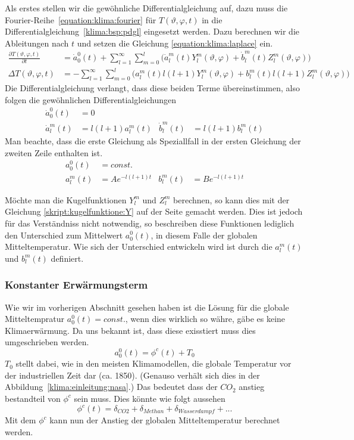\begin{refsection}
Als erstes stellen wir die gewöhnliche Differentialgleichung auf, dazu muss die Fourier-Reihe~\eqref{equation:klima:fourier} für $T(\vartheta ,\varphi ,t)$ in die Differentialgleichung~\eqref{klima:bsp:pdgl} eingesetzt werden.
Dazu berechnen wir die Ableitungen nach $t$ und setzen die Gleichung \eqref{equation:klima:laplace} ein.
\begin{align*}
\frac{\partial T(\vartheta ,\varphi ,t)}{\partial t} &=
\dot{a}^0_0(t)+\sum_{l=1}^\infty\sum_{m=0}^l \bigl( \dot{a}^m_l(t)Y^m_l(\vartheta ,\varphi)+\dot{b}^m_l(t)Z^m_l(\vartheta ,\varphi)\bigr)
\\
\Delta T(\vartheta ,\varphi ,t) &=
- \sum_{l=1}^\infty\sum_{m=0}^l \bigl( a^m_l(t)l(l+1)Y^m_l(\vartheta ,\varphi)+b^m_l(t)l(l+1)Z^m_l(\vartheta ,\varphi)\bigr)
\end{align*}
Die Differentialgleichung verlangt, dass diese beiden Terme übereinstimmen, also folgen die gewöhnlichen Differentialgleichungen
\begin{align*}
\dot a^0_0(t)&= 0
\\
\dot a^m_l(t)&=l(l+1)a^m_l(t)&
\dot b^m_l(t)&=l(l+1)b^m_l(t)
\end{align*}
Man beachte, dass die erste Gleichung als Speziallfall in der ersten
Gleichung der zweiten Zeile enthalten ist.
\begin{align*}
a^0_0(t)&=const.
\\
a^m_l(t) &=Ae^{-l(l+1)t}&
b^m_l(t) &=Be^{-l(l+1)t}
\end{align*}

Möchte man die Kugelfunktionen $Y^m_l$ und $Z^m_l$ berechnen, so kann dies mit der Gleichung \eqref{skript:kugelfunktione:Y} auf der Seite \pageref{skript:kugelfunktione:Y} gemacht werden. Dies ist jedoch für das Verständniss nicht notwendig, so beschreiben diese Funktionen lediglich den Unterschied zum Mittelwert $a^0_0(t)$, in diesem Falle der globalen Mitteltemperatur. Wie sich der Unterschied entwickeln wird ist durch die $a^m_l(t)$ und $b^m_l(t)$ definiert.


\subsubsection{Konstanter Erwärmungsterm
\label{subsubsection:klima:erwaermungsterm}}
Wie wir im vorherigen Abschnitt gesehen haben ist die Lösung für die globale Mitteltempratur $a^0_0(t)=const.$, wenn dies wirklich so währe, gäbe es keine Klimaerwärmung. Da uns bekannt ist, dass diese exisstiert muss dies umgeschrieben werden.
\begin{equation}
a^0_0(t)=\phi^c(t)+ T_0
\end{equation}
$T_0$ stellt dabei, wie in den meisten Klimamodellen, die globale Temperatur vor der industriellen Zeit dar (ca. 1850). (Genauso verhält sich dies in der Abbildung~\ref{klima:einleitung:nasa}.) Das bedeutet dass der $CO_2$ anstieg bestandteil von $\phi^c$ sein muss. Dies könnte wie folgt aussehen 
\begin{equation}
\phi^c(t)=\delta_{CO2}+\delta_{Methan}+\delta_{Wasserdampf}+...
\end{equation}
Mit dem $\phi^c$ kann nun der Anstieg der globalen Mitteltemperatur berechnet werden.



\end{refsection}
